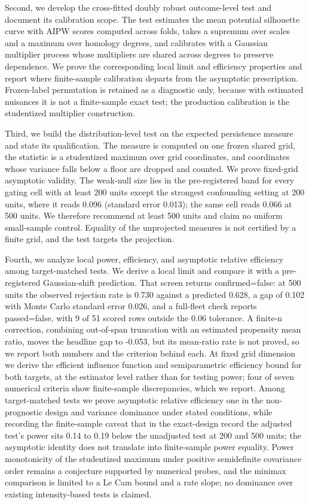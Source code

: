 Second, we develop the cross-fitted doubly robust outcome-level test and document its calibration scope. The test estimates the mean potential silhouette curve with AIPW scores computed across folds, takes a supremum over scales and a maximum over homology degrees, and calibrates with a Gaussian multiplier process whose multipliers are shared across degrees to preserve dependence. We prove the corresponding local limit and efficiency properties and report where finite-sample calibration departs from the asymptotic prescription. Frozen-label permutation is retained as a diagnostic only, because with estimated nuisances it is not a finite-sample exact test; the production calibration is the studentized multiplier construction.

Third, we build the distribution-level test on the expected persistence measure and state its qualification. The measure is computed on one frozen shared grid, the statistic is a studentized maximum over grid coordinates, and coordinates whose variance falls below a floor are dropped and counted. We prove fixed-grid asymptotic validity. The weak-null size lies in the pre-registered band for every gating cell with at least 200 units except the strongest confounding setting at 200 units, where it reads 0.096 (standard error 0.013); the same cell reads 0.066 at 500 units. We therefore recommend at least 500 units and claim no uniform small-sample control. Equality of the unprojected measures is not certified by a finite grid, and the test targets the projection.

Fourth, we analyze local power, efficiency, and asymptotic relative efficiency among target-matched tests. We derive a local limit and compare it with a pre-registered Gaussian-shift prediction. That screen returns confirmed=false: at 500 units the observed rejection rate is 0.730 against a predicted 0.628, a gap of 0.102 with Monte Carlo standard error 0.026, and a full-fleet check reports passed=false, with 9 of 51 scored rows outside the 0.06 tolerance. A finite-n correction, combining out-of-span truncation with an estimated propensity mean ratio, moves the headline gap to -0.053, but its mean-ratio rate is not proved, so we report both numbers and the criterion behind each. At fixed grid dimension we derive the efficient influence function and semiparametric efficiency bound for both targets, at the estimator level rather than for testing power; four of seven numerical criteria show finite-sample discrepancies, which we report. Among target-matched tests we prove asymptotic relative efficiency one in the non-prognostic design and variance dominance under stated conditions, while recording the finite-sample caveat that in the exact-design record the adjusted test's power sits 0.14 to 0.19 below the unadjusted test at 200 and 500 units; the asymptotic identity does not translate into finite-sample power equality. Power monotonicity of the studentized maximum under positive semidefinite covariance order remains a conjecture supported by numerical probes, and the minimax comparison is limited to a Le Cam bound and a rate slope; no dominance over existing intensity-based tests is claimed.

